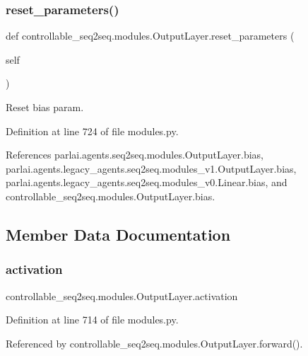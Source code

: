 \subsubsection{\texorpdfstring{reset\+\_\+parameters()}{reset\_parameters()}}
{\footnotesize\ttfamily def controllable\+\_\+seq2seq.\+modules.\+Output\+Layer.\+reset\+\_\+parameters (\begin{DoxyParamCaption}\item[{}]{self }\end{DoxyParamCaption})}

\begin{DoxyVerb}Reset bias param.\end{DoxyVerb}
 

Definition at line 724 of file modules.\+py.



References parlai.\+agents.\+seq2seq.\+modules.\+Output\+Layer.\+bias, parlai.\+agents.\+legacy\+\_\+agents.\+seq2seq.\+modules\+\_\+v1.\+Output\+Layer.\+bias, parlai.\+agents.\+legacy\+\_\+agents.\+seq2seq.\+modules\+\_\+v0.\+Linear.\+bias, and controllable\+\_\+seq2seq.\+modules.\+Output\+Layer.\+bias.



\subsection{Member Data Documentation}
\mbox{\label{classcontrollable__seq2seq_1_1modules_1_1OutputLayer_a4d93a31b950773bde47175bdcab28955}} 
\subsubsection{\texorpdfstring{activation}{activation}}
{\footnotesize\ttfamily controllable\+\_\+seq2seq.\+modules.\+Output\+Layer.\+activation}



Definition at line 714 of file modules.\+py.



Referenced by controllable\+\_\+seq2seq.\+modules.\+Output\+Layer.\+forward().

\mbox{\label{classcontrollable__seq2seq_1_1modules_1_1OutputLayer_a7e748364955b9813a0609abe8a90ab94}} 
